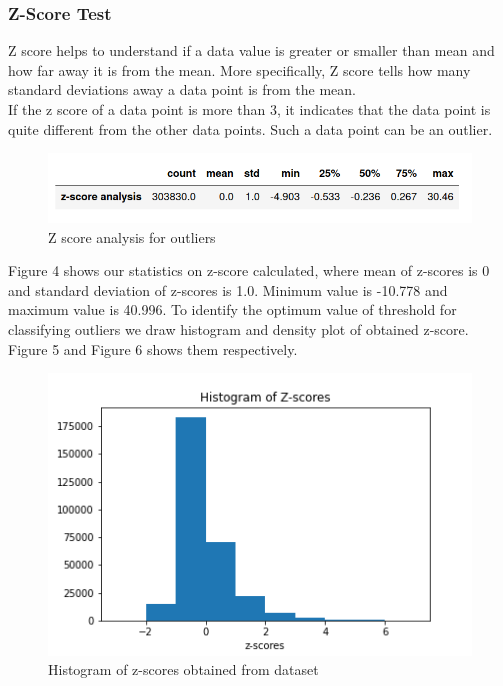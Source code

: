 \documentclass[12pt]{article}
\begin{document}
\newpage
\subsubsection{Z-Score Test}

Z score helps to understand if a data value is greater or smaller than mean and how far away it is from the mean. More specifically, Z score tells how many standard deviations away a data point is from the mean.\\
If the z score of a data point is more than 3, it indicates that the data point is quite different from the other data points. Such a data point can be an outlier. 

\begin{figure}[h]
	\centering
	\includegraphics[scale=0.5]{images/zscore.png}
	\caption{Z score analysis for outliers}
\end{figure}

Figure 4 shows our statistics on z-score calculated, where mean of z-scores is 0 and standard deviation of z-scores is 1.0. Minimum value is -10.778 and maximum value is 40.996.
To identify the optimum value of threshold for classifying outliers we draw histogram and density plot of obtained z-score. Figure 5 and Figure 6 shows them respectively.

\begin{figure}[h]
	\centering
	\includegraphics[scale=1]{images/zscore_histogram.png}
	\caption{Histogram of z-scores obtained from dataset}
\end{figure}
\end{document}
